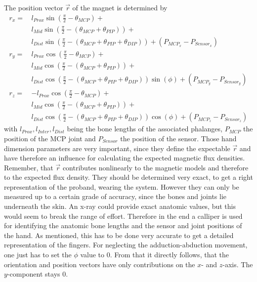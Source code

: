 The position vector $ \vec{r} $ of the magnet is determined by
\begin{equation}\label{eq:posX}
\begin{aligned}
r_{x} =\,&  l_{Prox}\sin(\frac{\pi}{2}-\theta_{MCP}) +\\
& l_{Mid}\sin(\frac{\pi}{2}-(\theta_{MCP}+\theta_{PIP})) +\\
& l_{Dist}\sin(\frac{\pi}{2}-(\theta_{MCP}+\theta_{PIP}+\theta_{DIP})) + (P_{MCP_{x}} - P_{Sensor_{x}}) \\[4pt]
r_{y} =\,&  l_{Prox}\cos(\frac{\pi}{2}-\theta_{MCP}) +\\
& l_{Mid}\cos(\frac{\pi}{2}-(\theta_{MCP}+\theta_{PIP})) +\\
& l_{Dist}\cos(\frac{\pi}{2}-(\theta_{MCP}+\theta_{PIP}+\theta_{DIP}))\sin(\phi) + (P_{MCP_{y}} - P_{Sensor_{y}}) \\[4pt]
r_{z} =&  -l_{Prox}\cos(\frac{\pi}{2}-\theta_{MCP}) +\\
& l_{Mid}\cos(\frac{\pi}{2}-(\theta_{MCP}+\theta_{PIP})) +\\
& l_{Dist}\cos(\frac{\pi}{2}-(\theta_{MCP}+\theta_{PIP}+\theta_{DIP}))\cos(\phi) +(P_{MCP_{z}} - P_{Sensor_{z}})
\end{aligned}
\end{equation}
with $ l_{Prox}, l_{Inter}, l_{Dist} $ being the bone lengths of the associated phalanges, $ P_{MCP} $ the position of the \ac{MCP} joint and $ P_{Sensor} $ the position of the sensor. Those hand dimension parameters are very important, since they define the expectable $ \vec{r} $ and have therefore an influence for calculating the expected magnetic flux densities. Remember, that $ \vec{r} $ contributes nonlinearly to the magnetic models and therefore to the expected flux density. They should be determined very exact, to get a right representation of the proband, wearing the system. However they can only be measured up to a certain grade of accuracy, since the bones and joints lie underneath the skin. An x-ray could provide exact anatomic values, but this would seem to break the range of effort. Therefore in the end a calliper is used for identifying the anatomic bone lengths and the sensor and joint positions of the hand. As mentioned, this has to be done very accurate to get a detailed representation of the fingers. For neglecting the adduction-abduction movement, one just has to set the $ \phi $ value to 0. From that it directly follows, that the orientation and position vectors have only contributions on the $ x $- and $ z $-axis. The $ y $-component stays 0.\\
